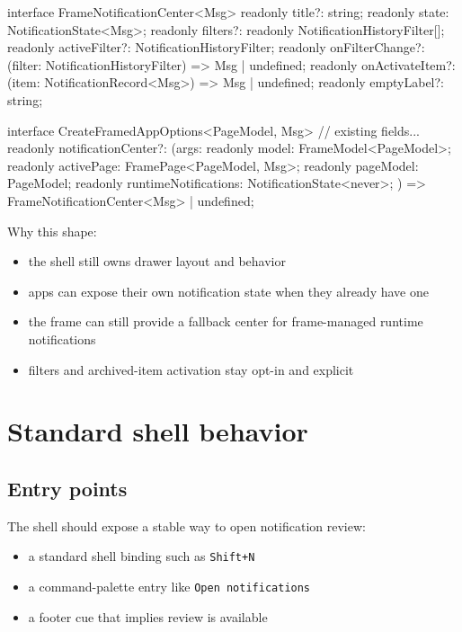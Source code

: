 \begin{CodeBlock}
interface FrameNotificationCenter<Msg> {
  readonly title?: string;
  readonly state: NotificationState<Msg>;
  readonly filters?: readonly NotificationHistoryFilter[];
  readonly activeFilter?: NotificationHistoryFilter;
  readonly onFilterChange?: (filter: NotificationHistoryFilter) => Msg | undefined;
  readonly onActivateItem?: (item: NotificationRecord<Msg>) => Msg | undefined;
  readonly emptyLabel?: string;
}

interface CreateFramedAppOptions<PageModel, Msg> {
  // existing fields...
  readonly notificationCenter?: (args: {
    readonly model: FrameModel<PageModel>;
    readonly activePage: FramePage<PageModel, Msg>;
    readonly pageModel: PageModel;
    readonly runtimeNotifications: NotificationState<never>;
  }) => FrameNotificationCenter<Msg> | undefined;
}
\end{CodeBlock}

Why this shape:

\begin{itemize}
\tightlist
\item
  the shell still owns drawer layout and behavior
\item
  apps can expose their own notification state when they already have one
\item
  the frame can still provide a fallback center for frame-managed runtime notifications
\item
  filters and archived-item activation stay opt-in and explicit
\end{itemize}

\section{Standard shell behavior}\label{record-053-standard-shell-behavior}

\subsection{Entry points}\label{record-053-entry-points}

The shell should expose a stable way to open notification review:

\begin{itemize}
\tightlist
\item
  a standard shell binding such as \texttt{S\allowbreak{}h\allowbreak{}i\allowbreak{}f\allowbreak{}t\allowbreak{}+\allowbreak{}N}
\item
  a command-palette entry like \texttt{O\allowbreak{}p\allowbreak{}e\allowbreak{}n\allowbreak{} \allowbreak{}n\allowbreak{}o\allowbreak{}t\allowbreak{}i\allowbreak{}f\allowbreak{}i\allowbreak{}c\allowbreak{}a\allowbreak{}t\allowbreak{}i\allowbreak{}o\allowbreak{}n\allowbreak{}s}
\item
  a footer cue that implies review is available
\end{itemize}

